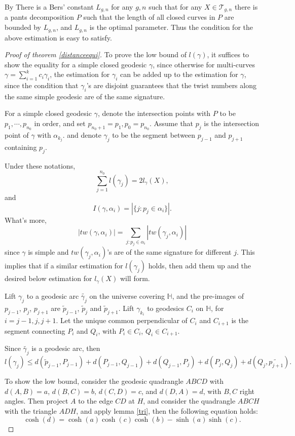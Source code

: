 \begin{remark}
By There is a Bers' constant $L_{g,n}$ for any $g,n$ such that for any $X\in \mathscr{T}_{g,n}$ there is a pants decomposition $P$ such that the length of all closed curves in $P$ are bounded by $L_{g,n}$, and $L_{g,n}$ is the  optimal parameter.  Thus the condition for the above estimation is easy to satisfy.  
\end{remark}

\begin{proof}[Proof of theorem \ref{distanceequi}]
To prove the low bound of $l(\gamma)$, it suffices to show the equality for a simple closed geodesic $\gamma$, since otherwise for multi-curves $\gamma=\sum_{i=1}^kc_i\gamma_i$, the estimation for $\gamma_i$ can be added up to the estimation for $\gamma$, since the condition that $\gamma_i$'s are disjoint guarantees that the twist numbers along the same simple geodesic are of the same signature.

For a   simple closed geodesic $\gamma$, denote the intersection points with $P$ to be $p_1,\cdots, p_{n_0}$ in order, and set $p_{n_0+1}=p_1, p_0=p_{n_0}$. Assume that  $p_j$ is the intersection point of $\gamma$ with $\alpha_{k_j}$. and denote $\gamma_j$ to be the segment between $p_{j-1}$ and $p_{j+1}$ containing $p_j$.

Under these  notations, $$\sum_{j=1}^{n_0}l(\gamma_j)=2l_\gamma(X),$$ and  $$I(\gamma,\alpha_i)=|\{j:p_j\in \alpha_i\}|.$$  What's more, $$|tw(\gamma,\alpha_i)|=\sum_{j:p_j\in \alpha_i}|tw(\gamma_j,\alpha_i)|$$ since $\gamma$ is simple and $tw(\gamma_j,\alpha_i)$'s are of the same signature for different $j$. This implies that if a similar estimation for $l(\gamma_j)$ holds, then  add them up and  the desired below estimation for $l_\gamma(X)$ will form.  

Lift $\gamma_j$ to a geodesic arc $\tilde{\gamma_j}$ on the universe covering $\mathbb{H}$, and the pre-images of $p_{j-1}$, $p_j$, $p_{j+1}$  are $\tilde{p}_{j-1}$, $\tilde{p}_{j}$ and $\tilde{p}_{j+1}$. Lift $\gamma_{k_i}$ to  geodesics $C_i$ on $\mathbb{H}$, for $i=j-1,j,j+1$.
Let the unique common perpendicular of $C_{i}$ and $C_{i+1}$ is the segment connecting  $P_i$ and $Q_i$, with $P_i\in C_i$, $Q_i\in C_{i+1}$. 

Since $\tilde{\gamma_j}$ is a geodesic arc, then $$l(\gamma_j)\leq d(\tilde{p}_{j-1},P_{j-1})+d(P_{j-1},Q_{j-1})+d(Q_{j-1},P_j)+d(P_j,Q_j)+d(Q_j,\tilde{p_{j+1}}).$$

To show the low bound, consider the geodesic quadrangle $ABCD$ with $d(A,B)=a$, $d(B,C)=b$, $d(C,D)=c$, and $d(D,A)=d$, with $B,C$ right angles. Then project $A$ to the edge $CD$ at $H$, and consider the quadrangle $ABCH$ with the triangle $ADH$, and  apply  lemma \ref{tri}, then the following  equation holds\cite{Buser}:
\begin{equation}\label{tworight}
    \cosh(d)=\cosh(a)\cosh(c)\cosh(b)-\sinh(a)\sinh(c).
\end{equation}


\end{proof}
